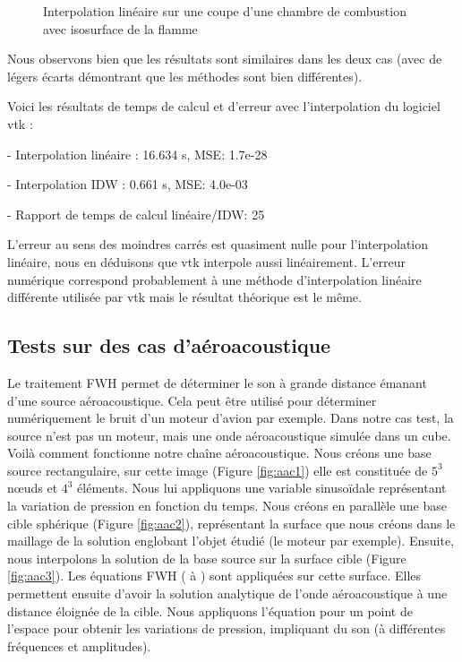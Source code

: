 \begin{figure}[H]
\begin{minipage}[b]{0.47\textwidth}
        \caption{Interpolation linéaire sur une coupe d'une chambre de combustion avec isosurface de la flamme}
        \label{fig:cb-lineaire}
    \end{minipage}
\end{figure}


Nous observons bien que les résultats sont similaires dans les deux cas (avec de légers écarts démontrant que les méthodes sont bien différentes).

Voici les résultats de temps de calcul et d'erreur avec l'interpolation du logiciel vtk :

- Interpolation linéaire :         16.634 s, MSE: 1.7e-28

\vspace{-0,2cm}

- Interpolation IDW :\hspace{0,4cm} 0.661 s, MSE: 4.0e-03

\vspace{-0,2cm}

- Rapport de temps de calcul linéaire/IDW: 25

L'erreur au sens des moindres carrés est quasiment nulle pour l'interpolation linéaire, nous en déduisons que vtk interpole aussi linéairement. L'erreur numérique correspond probablement à une méthode d'interpolation linéaire différente utilisée par vtk mais le résultat théorique est le même.

\subsection{Tests sur des cas d'aéroacoustique}\label{s241}

Le traitement FWH permet de déterminer le son à grande distance émanant d'une source aéroacoustique. Cela peut être utilisé pour déterminer numériquement le bruit d'un moteur d'avion par exemple.
Dans notre cas test, la source n'est pas un moteur, mais une onde aéroacoustique simulée dans un cube.
Voilà comment fonctionne notre chaîne aéroacoustique.\label{s243}
Nous créons une base source rectangulaire, sur cette image (Figure \ref{fig:aac1}) elle est constituée de $5^3$ nœuds et $4^3$ éléments.
Nous lui appliquons une variable sinusoïdale représentant la variation de pression en fonction du temps.
Nous créons en parallèle une base cible sphérique (Figure \ref{fig:aac2}), représentant la surface que nous créons dans le maillage de la solution englobant l'objet étudié (le moteur par exemple).
Ensuite, nous interpolons la solution de la base source sur la surface cible (Figure \ref{fig:aac3}).
Les équations FWH ( à ) sont appliquées sur cette surface. Elles permettent ensuite d'avoir la solution analytique de l'onde aéroacoustique à une distance éloignée de la cible. Nous appliquons l'équation pour un point de l'espace pour obtenir les variations de pression, impliquant du son (à différentes fréquences et amplitudes).

